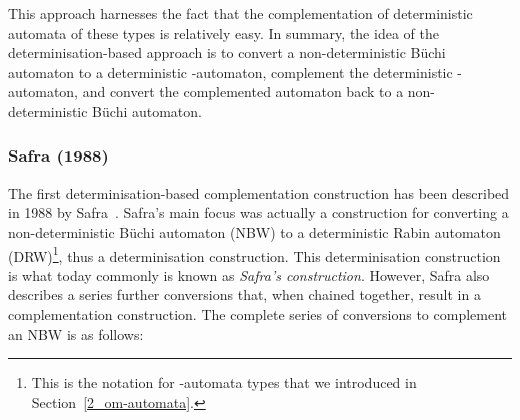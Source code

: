 This approach harnesses the fact that the complementation of deterministic automata of these types is relatively easy. In summary, the idea of the determinisation-based approach is to convert a non-deterministic Büchi automaton to a deterministic \om-automaton, complement the deterministic \om-automaton, and convert the complemented automaton back to a non-deterministic Büchi automaton.




\subsubsection{Safra (1988)}
\label{2_safra88}
The first determinisation-based complementation construction has been described in 1988 by Safra~\cite{1988_safra_2,1988_safra_1}. Safra's main focus was actually a construction for converting a non-deterministic Büchi automaton (NBW) to a deterministic Rabin automaton (DRW)\footnote{This is the notation for \om-automata types that we introduced in Section~\ref{2_om-automata}.}, thus a determinisation construction. This determinisation construction is what today commonly is known as \textit{Safra's construction}. However, Safra also describes a series further conversions that, when chained together, result in a complementation construction. The complete series of conversions to complement an NBW is as follows:


